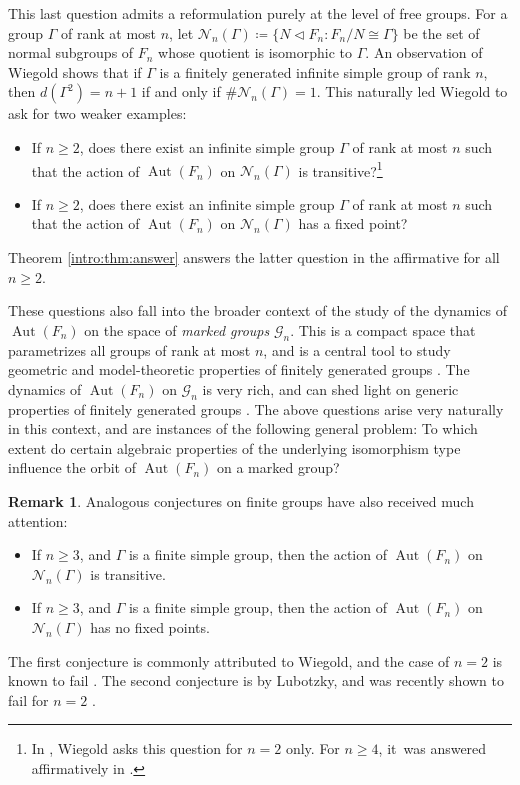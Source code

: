 \documentclass[11pt]{article}
\theoremstyle{definition}
\newtheorem{remark}[theorem]{Remark}
\newcommand{\Aut}{\operatorname{Aut}}
\begin{document}
This last question admits a reformulation purely at the level of free groups. For a group $\Gamma$ of rank at most $n$, let $\mathcal{N}_n(\Gamma) \coloneqq \{ N \triangleleft F_n : F_n/N \cong \Gamma \}$ be the set of normal subgroups of $F_n$ whose quotient is isomorphic to $\Gamma$. An observation of Wiegold \cite{w:tarski} shows that if $\Gamma$ is a finitely generated infinite simple group of rank $n$, then $d(\Gamma^2) = n+1$ if and only if $\# \mathcal{N}_n(\Gamma) = 1$. This naturally led Wiegold to ask for two weaker examples:
\begin{itemize}
\item \cite[Quest.\,16.100]{kourovka} If $n \geq 2$, does there exist an infinite simple group $\Gamma$ of rank at most $n$ such that the action of $\Aut(F_n)$ on $\mathcal{N}_n(\Gamma)$ is transitive?\footnote{In \cite[Quest.\,16.100]{kourovka}, Wiegold asks this question for $n = 2$ only. For $n \geq 4$, it~was answered affirmatively in \cite[Th.\,4]{garionglasner}.}
\item \cite[Quest.\,6.45]{kourovka} If $n \geq 2$, does there exist an infinite simple group $\Gamma$ of rank at most $n$ such that the action of $\Aut(F_n)$ on $\mathcal{N}_n(\Gamma)$ has a fixed point?
\end{itemize}
Theorem \ref{intro:thm:answer} answers the latter question in the affirmative for all $n \geq 2$.

These questions also fall into the broader context of the study of the dynamics of $\Aut(F_n)$ on the space of \emph{marked groups} $\mathcal{G}_n$. This is a compact space that parametrizes all groups of rank at most $n$, and is a central tool to study geometric and model-theoretic properties of finitely generated groups \cite{grigorchuk, champetier, limit, diversity, osin:law}. The dynamics of $\Aut(F_n)$ on $\mathcal{G}_n$ is very rich, and can shed light on generic properties of finitely generated groups \cite{osin:aut}. The above questions arise very naturally in this context, and are instances of the following general problem: To which extent do certain algebraic properties of the underlying isomorphism type influence the orbit of $\Aut(F_n)$ on a marked group?

\begin{remark}
\label{rem:finite}
Analogous conjectures on finite groups have also received much attention:
\begin{itemize}
\item \cite[Conj.\,2.5.4]{pak:question} If $n \geq 3$, and $\Gamma$ is a finite simple group, then the action of $\Aut(F_n)$ on $\mathcal{N}_n(\Gamma)$ is transitive.
\item \cite[p.\,25]{lubotzky:question} If $n \geq 3$, and $\Gamma$ is a finite simple group, then the action of $\Aut(F_n)$ on $\mathcal{N}_n(\Gamma)$ has no fixed points.
\end{itemize}
The first conjecture is commonly attributed to Wiegold, and the case of $n = 2$ is known to fail \cite{counterexample, counterexample:statistic}. The second conjecture is by Lubotzky, and was recently shown to fail for $n = 2$ \cite{counterexample:baby, counterexample:baby2}.
\end{remark}
\end{document}
